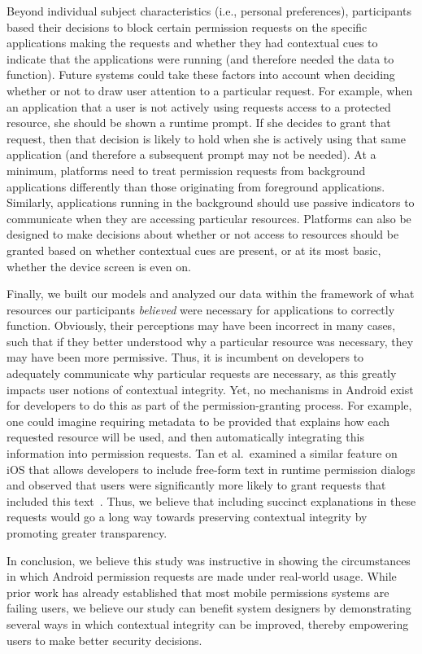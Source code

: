\documentclass[letterpaper,twocolumn,10pt]{article}
\begin{document}
Beyond individual subject characteristics (i.e., personal preferences), participants based their decisions to block certain permission requests on the specific applications making the requests and whether they had contextual cues to indicate that the applications were running (and therefore needed the data to function). Future systems could take these factors into account when deciding whether or not to draw user attention to a particular request. For example, when an application that a user is not actively using requests access to a protected resource, she should be shown a runtime prompt. If she decides to grant that request, then that decision is likely to hold when she is actively using that same application (and therefore a subsequent prompt may not be needed). At a minimum, platforms need to treat permission requests from background applications differently than those originating from foreground applications. Similarly, applications running in the background should use passive indicators to communicate when they are accessing particular resources. Platforms can also be designed to make decisions about whether or not access to resources should be granted based on whether contextual cues are present, or at its most basic, whether the device screen is even on.

Finally, we built our models and analyzed our data within the framework of what resources our participants {\it believed} were necessary for applications to correctly function. Obviously, their perceptions may have been incorrect in many cases, such that if they better understood why a particular resource was necessary, they may have been more permissive. Thus, it is incumbent on developers to adequately communicate why particular requests are necessary, as this greatly impacts user notions of contextual integrity. Yet, no mechanisms in Android exist for developers to do this as part of the permission-granting process. For example, one could imagine requiring metadata to be provided that explains how each requested resource will be used, and then automatically integrating this information into permission requests. Tan et al.\ examined a similar feature on iOS that allows developers to include free-form text in runtime permission dialogs and observed that users were significantly more likely to grant requests that included this text~\cite{Tan2014}. Thus, we believe that including succinct explanations in these requests would go a long way towards preserving contextual integrity by promoting greater transparency.

In conclusion, we believe this study was instructive in showing the circumstances in which Android permission requests are made under real-world usage. While prior work has already established that most mobile permissions systems are failing users, we believe our study can benefit system designers by demonstrating several ways in which contextual integrity can be improved, thereby empowering users to make better security decisions.
\end{document}
